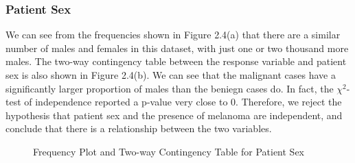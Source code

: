 \documentclass [MAS] {uclathes}
\begin{document}
\subsubsection*{Patient Sex}

We can see from the frequencies shown in Figure 2.4(a) that there are a similar number of males and females in this dataset, with just one or two thousand more males. The two-way contingency table between the response variable and patient sex is also shown in Figure 2.4(b). We can see that the malignant cases have a significantly larger proportion of males than the beniegn cases do. In fact, the $\chi^2$-test of independence reported a p-value very close to 0. Therefore, we reject the hypothesis that patient sex and the presence of melanoma are independent, and conclude that there is a relationship between the two variables.

\begin{figure}[h!tbp]
    \hspace*{\fill}
    \centering
    \hspace{1em}
    \hspace*{\fill}
    \label{fig:sex_eda_tab}
    \vspace{0cm}
    \caption{Frequency Plot and Two-way Contingency Table for Patient Sex}
    \end{figure}
\end{document}
